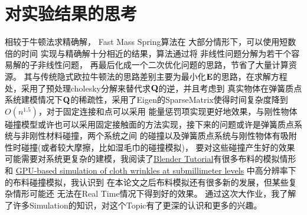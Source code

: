 \documentclass[]{ctexart}
\begin{document}
\section{对实验结果的思考}

相较于牛顿法求精确解，
Fast Mass Spring算法在
大部分情形下，可以使用短数倍的时间
实现与精确解十分相近的结果，算法通过将
非线性问题分解为若干个容易解的子非线性问题，
再最后化成一个二次优化问题的思路，节省了大量计算资源。
其与传统隐式欧拉牛顿法的思路差别主要为最小化$\bold{E}$的思路，在求解方程处，采用了预处理cholesky分解来替代求$\bold{Q}$的逆，并且考虑到
真实物体在弹簧质点系统建模情况下$\bold{Q}$的稀疏性，采用了Eigen的SparseMatrix使得时间复杂度降到$O(n^{1.5})$，对于固定连接和点可以采用
能量惩罚项实现更好地效果，与刚性物体碰撞模型或许也可以采用固定接触面的方法实现，接下来的问题或许是弹簧质点系统与非刚性材料碰撞，两个系统之间
的碰撞以及弹簧质点系统与刚性物体有吸附性时碰撞(或者较大摩擦，比如湿毛巾的碰撞模拟)，
要对这些碰撞产生好的效果可能需要对系统更复杂的建模，我阅读了\href{https://renderguide.com/blender-cloth-simulation-tutorial/}{Blender Tutorial}有很多布料的模拟情形和
\href{https://dl.acm.org/doi/abs/10.1145/3450626.3459787}{GPU-based simulation of cloth wrinkles at submillimeter levels}
中高分辨率下的布料碰撞模拟，我认识到
在本论文之后布料模拟还有很多新的发展，但某些复杂情形可能还
无法在Real Time情况下得到好的效果。
通过这次大作业，我了解了许多Simulation的知识，对这个Topic有了更深的认识和更多的兴趣。


\end{document}
